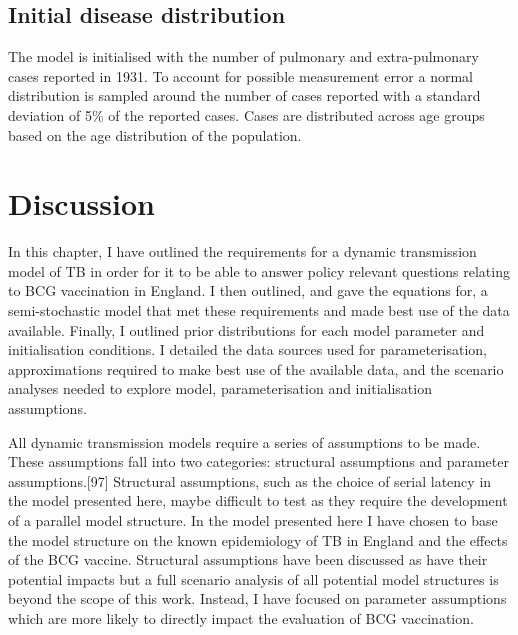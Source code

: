 \documentclass[11pt,twoside]{bristolthesis}
\begin{document}
  \hypertarget{initial-disease-distribution}{%
  \subsection{Initial disease distribution}\label{initial-disease-distribution}}
  
  The model is initialised with the number of pulmonary and extra-pulmonary cases reported in 1931. To account for possible measurement error a normal distribution is sampled around the number of cases reported with a standard deviation of 5\% of the reported cases. Cases are distributed across age groups based on the age distribution of the population.
  
  \hypertarget{discussion-3}{%
  \section{Discussion}\label{discussion-3}}
  
  In this chapter, I have outlined the requirements for a dynamic transmission model of TB in order for it to be able to answer policy relevant questions relating to BCG vaccination in England. I then outlined, and gave the equations for, a semi-stochastic model that met these requirements and made best use of the data available. Finally, I outlined prior distributions for each model parameter and initialisation conditions. I detailed the data sources used for parameterisation, approximations required to make best use of the available data, and the scenario analyses needed to explore model, parameterisation and initialisation assumptions.
  
  All dynamic transmission models require a series of assumptions to be made. These assumptions fall into two categories: structural assumptions and parameter assumptions.{[}97{]} Structural assumptions, such as the choice of serial latency in the model presented here, maybe difficult to test as they require the development of a parallel model structure. In the model presented here I have chosen to base the model structure on the known epidemiology of TB in England and the effects of the BCG vaccine. Structural assumptions have been discussed as have their potential impacts but a full scenario analysis of all potential model structures is beyond the scope of this work. Instead, I have focused on parameter assumptions which are more likely to directly impact the evaluation of BCG vaccination.
  
\end{document}
